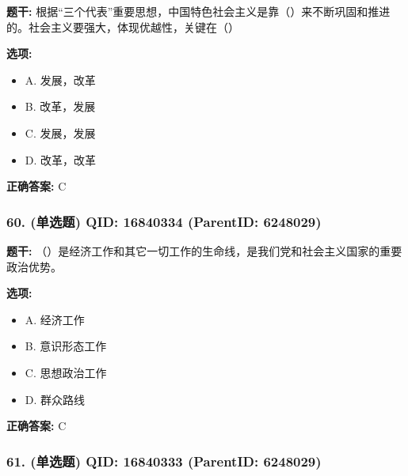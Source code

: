 \documentclass[12pt,UTF8]{ctexart}
\begin{document}
\textbf{题干:}
根据“三个代表”重要思想，中国特色社会主义是靠（）来不断巩固和推进的。社会主义要强大，体现优越性，关键在（）



\textbf{选项:}
\begin{itemize}[leftmargin=*]

  \item A. 发展，改革

  \item B. 改革，发展

  \item C. 发展，发展

  \item D. 改革，改革

\end{itemize}

\textbf{正确答案:}
C

\vspace{0.3em}\hrulefill\vspace{0.7em}

\subsubsection*{60. (单选题) \small QID: 16840334 (ParentID: 6248029)}

\textbf{题干:}
（）是经济工作和其它一切工作的生命线，是我们党和社会主义国家的重要政治优势。



\textbf{选项:}
\begin{itemize}[leftmargin=*]

  \item A. 经济工作

  \item B. 意识形态工作

  \item C. 思想政治工作

  \item D. 群众路线

\end{itemize}

\textbf{正确答案:}
C

\vspace{0.3em}\hrulefill\vspace{0.7em}

\subsubsection*{61. (单选题) \small QID: 16840333 (ParentID: 6248029)}
\end{document}
